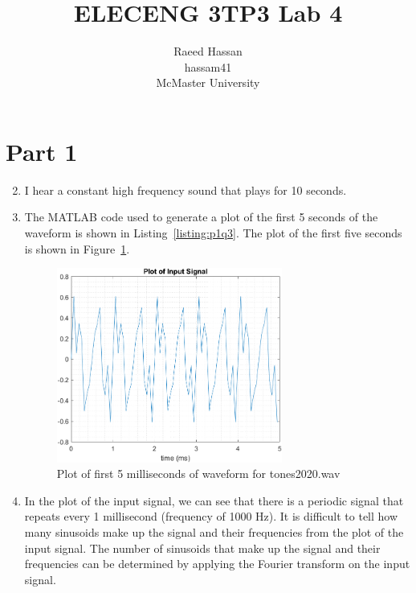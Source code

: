 \documentclass[12pt]{article}
\title{ELECENG 3TP3 Lab 4}
\author{Raeed Hassan \\ hassam41 \\ McMaster University}
\begin{document}
\maketitle
\pagebreak
\section*{Part 1}
\begin{enumerate}
    \setcounter{enumi}{1}
    \item I hear a constant high frequency sound that plays for 10 seconds.
    \item The MATLAB code used to generate a plot of the first 5 seconds of the waveform is shown in Listing~\ref{listing:p1q3}. The plot of the first five seconds is shown in Figure~\ref{fig:p1q3}.
    
    \begin{figure}[ht]
        \centering
        \includegraphics[width=0.7\textwidth]{part1q3.png}
        \caption{\label{fig:p1q3}Plot of first 5 milliseconds of waveform for tones2020.wav}
    \end{figure}
    \item In the plot of the input signal, we can see that there is a periodic signal that repeats every 1 millisecond (frequency of 1000 Hz). It is difficult to tell how many sinusoids make up the signal and their frequencies from the plot of the input signal. The number of sinusoids that make up the signal and their frequencies can be determined by applying the Fourier transform on the input signal.


\end{enumerate}
\end{document}
